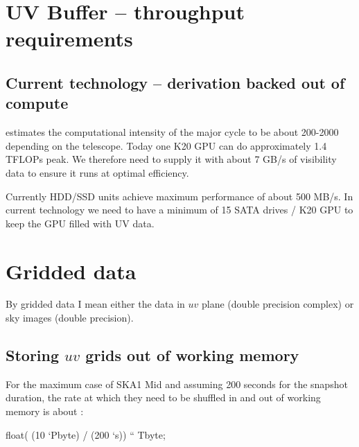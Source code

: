 \documentclass[useAMS,usenatbib,referee]{article}
\begin{document}
\section{UV Buffer -- throughput requirements}

\subsection{Current technology -- derivation backed out of compute}

\cite{MajCycleModel} estimates the computational intensity of the
major cycle to be about 200-2000 depending on the telescope. Today one
K20 GPU can do approximately 1.4 TFLOPs peak. We therefore need to
supply it with about 7 GB/s of visibility data to ensure it runs at
optimal efficiency. 

Currently HDD/SSD units achieve maximum performance of about 500 MB/s.
In current technology we need to have a minimum of 15 SATA drives /
K20 GPU to keep the GPU filled with UV data. 

\section{Gridded data}

By gridded data I mean either the data in $uv$ plane (double precision
complex) or sky images (double precision).

\subsection{Storing $uv$ grids out of working memory}

For the maximum case of SKA1 Mid and assuming 200 seconds for the
snapshot duration, the rate at which they need to be shuffled in and
out of working memory is about :
\begin{maxima}[]
float( (10 `Pbyte)  / (200 `s)) `` Tbyte;
\maximaoutput*
{}\; \\
\end{maxima}


 

\end{document}
